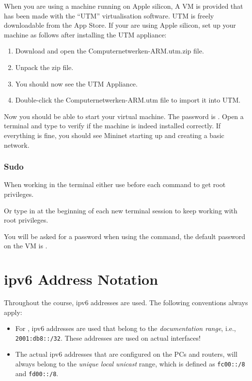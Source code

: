 When you are using a machine running on Apple silicon, A VM is provided that has been made with the ``UTM'' virtualisation software. UTM is freely downloadable from the App Store. If your are using Apple silicon, set up your machine as follows after installing the UTM appliance:
\begin{enumerate}
	\item Download and open the Computernetwerken-ARM.utm.zip file.
	\item Unpack the zip file.
	\item You should now see the UTM Appliance.
	\item Double-click the Computernetwerken-ARM.utm file to import it into UTM.
	\end{enumerate}

Now you should be able to start your virtual machine. The password is . Open a terminal and type  to verify if the machine is indeed installed correctly. If everything is fine, you should see Mininet starting up and creating a basic network.

\subsubsection{Sudo}
When working in the terminal either use  before each command to get root privileges.
\begin{cmdblock}[gobble=1]
\end{cmdblock}

Or type in  at the beginning of each new terminal session to keep working with root privileges.

You will be asked for a password when using the  command, the default password on the VM is .

\section{\acs{ipv6} Address Notation}
Throughout the course, \ac{ipv6} addresses are used. The following conventions always apply:
\begin{itemize}
\item For , \ac{ipv6} addresses are used that belong to the \emph{documentation range}, i.e., \texttt{2001:db8::/32}. These addresses are  used on actual interfaces!
\item The actual \ac{ipv6} addresses that are configured on the PCs and routers, will always belong to the \emph{unique local unicast} range, which is defined as \texttt{fc00::/8} and \texttt{fd00::/8}.
\end{itemize}


